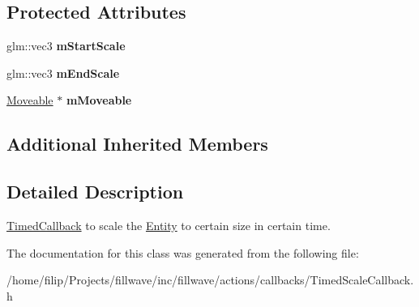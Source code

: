 \subsection*{Protected Attributes}
\begin{DoxyCompactItemize}
\item 
glm\+::vec3 {\bfseries m\+Start\+Scale}\hypertarget{classflw_1_1flf_1_1TimedScaleCallback_a692267ce92db35c957a394a638ca3501}{}\label{classflw_1_1flf_1_1TimedScaleCallback_a692267ce92db35c957a394a638ca3501}

\item 
glm\+::vec3 {\bfseries m\+End\+Scale}\hypertarget{classflw_1_1flf_1_1TimedScaleCallback_ab995ca9b69cefbbda4285b7413b4bb39}{}\label{classflw_1_1flf_1_1TimedScaleCallback_ab995ca9b69cefbbda4285b7413b4bb39}

\item 
\hyperlink{classflw_1_1flf_1_1Moveable}{Moveable} $\ast$ {\bfseries m\+Moveable}\hypertarget{classflw_1_1flf_1_1TimedScaleCallback_ada806e6c55af0d8cdc9caeca29137277}{}\label{classflw_1_1flf_1_1TimedScaleCallback_ada806e6c55af0d8cdc9caeca29137277}

\end{DoxyCompactItemize}
\subsection*{Additional Inherited Members}


\subsection{Detailed Description}
\hyperlink{classflw_1_1flf_1_1TimedCallback}{Timed\+Callback} to scale the \hyperlink{classflw_1_1flf_1_1Entity}{Entity} to certain size in certain time. 

The documentation for this class was generated from the following file\+:\begin{DoxyCompactItemize}
\item 
/home/filip/\+Projects/fillwave/inc/fillwave/actions/callbacks/Timed\+Scale\+Callback.\+h\end{DoxyCompactItemize}
